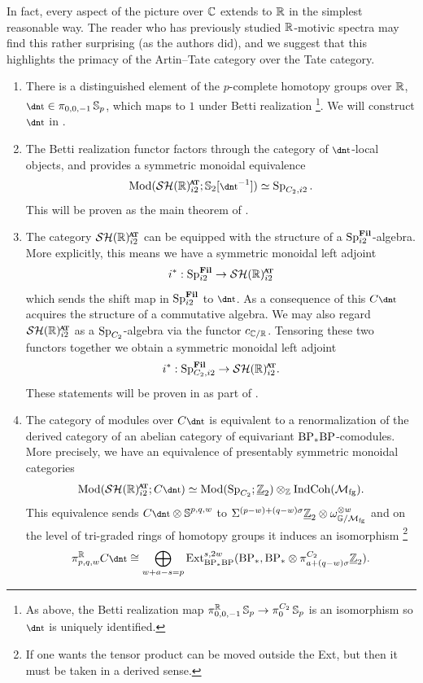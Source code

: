 In fact, every aspect of the picture over $\mathbb{C}$ extends to $\mathbb{R}$ in the simplest reasonable way.
The reader who has previously studied $\mathbb{R}$-motivic spectra may find this rather surprising (as the authors did), and we suggest that this highlights the primacy of the Artin--Tate category over the Tate category.

\begin{enumerate}
\item There is a distinguished element of the $p$-complete homotopy groups over $\mathbb{R}$,
  $\ta \in \pi_{0,0,-1}\Ss_p$, which maps to $1$ under Betti realization \footnote{As above, the Betti realization map $\pi^{\mathbb{R}}_{0,0,-1}\operatorname{\mathbb{S}}_p \to \pi^{C_2}_0\operatorname{\mathbb{S}}_p$ is an isomorphism so $\ta$ is uniquely identified.}. We will construct $\ta$ in .
\item The Betti realization functor factors through the category of $\ta$-local objects, and provides a symmetric monoidal equivalence
  \[ \Mod ( \SHRat ; \Ss_2[\ta^{-1}] ) \simeq \Sp_{C_2,i2}. \]
  This will be proven as the main theorem of .  
\item The category $\SHRat$ can be equipped with the structure of a $\operatorname{\mathrm{Sp}}_{i2}^{\operatorname{\mathbf{Fil}}}$-algebra.
  More explicitly, this means we have a symmetric monoidal left adjoint
  \[ i^* : \Sp_{i2}^{\Fil} \to \SHRat \]
  which sends the shift map in $\operatorname{\mathrm{Sp}}_{i2}^{\operatorname{\mathbf{Fil}}}$ to $\ta$.
  As a consequence of this $C\ta$ acquires the structure of a commutative algebra.
  We may also regard $\SHRat$ as a $\operatorname{\mathrm{Sp}}_{C_2}$-algebra via the functor $c_{\mathbb{C}/\mathbb{R}}$.
  Tensoring these two functors together we obtain a symmetric monoidal left adjoint
  \[ i^* : \Sp_{C_2, i2}^{\Fil} \to \SHRat. \]
    These statements will be proven in  as part of .
\item The category of modules over $C\ta$ is equivalent to a renormalization of the derived category of an abelian category of equivariant $\mathrm{BP}_*\mathrm{BP}$-comodules. More precisely, we have an equivalence of presentably symmetric monoidal categories
  \[ \Mod ( \SHRat ; C\ta ) \simeq \Mod(\Sp_{C_2} ; \uZt) \otimes_{\Z} \IndCoh ( \Mfg ). \]
  This equivalence sends $C\ta \otimes \Ss^{p,q,w}$ to $\Sigma^{(p-w)+(q-w)\sigma} \underline{\mathbb{Z}}_{2} \otimes \omega_{\mathbb{G}/\mathcal{M}_{\mathrm{fg}}} ^{\otimes w}$ and on the level of tri-graded rings of homotopy groups it induces an isomorphism \footnote{If one wants the tensor product can be moved outside the Ext, but then it must be taken in a derived sense.}
  \[ \pi_{p,q,w}^\R C\ta \cong \bigoplus_{w+a-s = p} \Ext_{\BP_*\BP}^{s,2w}(\BP_*, \BP_* \otimes \pi_{a + (q-w) \sigma}^{C_2} \uZt). \]

\end{enumerate}
